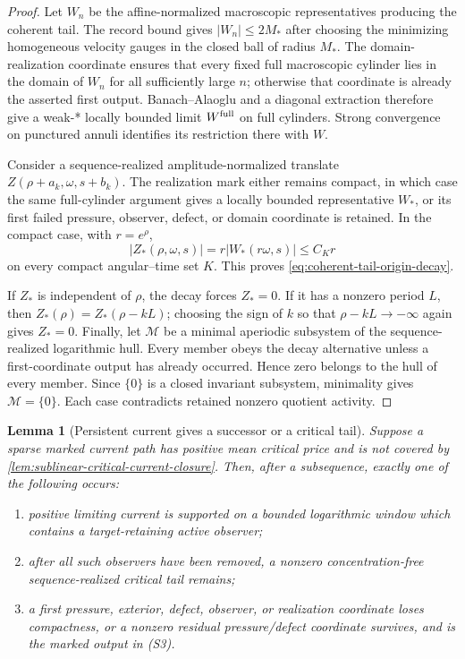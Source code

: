 \documentclass[11pt]{amsart}
\numberwithin{equation}{section}
\theoremstyle{plain}
\newtheorem{lemma}[lemma]{Lemma}
\theoremstyle{definition}
\theoremstyle{remark}
\begin{document}
\begin{proof}
Let \(W_n\) be the affine-normalized macroscopic representatives producing
the coherent tail.  The record bound gives \(|W_n|\le2M_*\) after choosing
the minimizing homogeneous velocity gauges in the closed ball of radius
\(M_*\).  The domain-realization coordinate ensures that every fixed full
macroscopic cylinder lies in the domain of \(W_n\) for all sufficiently large
\(n\); otherwise that coordinate is already the asserted first output.
Banach--Alaoglu and a diagonal extraction therefore give a weak-* locally
bounded limit \(W^{\rm full}\) on full cylinders.  Strong convergence on
punctured annuli identifies its restriction there with \(W\).

Consider a sequence-realized amplitude-normalized translate
\(Z(\rho+a_k,\omega,s+b_k)\).  The realization mark either remains compact,
in which case the same full-cylinder argument gives a locally bounded
representative \(W_*\), or its first failed pressure, observer, defect, or
domain coordinate is retained.  In the compact case, with \(r=e^\rho\),
\[
 |Z_*(\rho,\omega,s)|=r|W_*(r\omega,s)|\le C_Kr
\]
on every compact angular--time set \(K\).  This proves
\eqref{eq:coherent-tail-origin-decay}.

If \(Z_*\) is independent of \(\rho\), the decay forces \(Z_*=0\).  If it has
a nonzero period \(L\), then
\(Z_*(\rho)=Z_*(\rho-kL)\); choosing the sign of \(k\) so that
\(\rho-kL\to-\infty\) again gives \(Z_*=0\).  Finally, let \(\mathcal M\) be
a minimal aperiodic subsystem of the sequence-realized logarithmic hull.
Every member obeys the decay alternative unless a first-coordinate output has
already occurred.  Hence zero belongs to the hull of every member.  Since
\(\{0\}\) is a closed invariant subsystem, minimality gives
\(\mathcal M=\{0\}\).  Each case contradicts retained nonzero quotient
activity.
\end{proof}

\begin{lemma}[Persistent current gives a successor or a critical tail]
\label{lem:persistent-current-support-alternative}
Suppose a sparse marked current path has positive mean critical price and is
not covered by \cref{lem:sublinear-critical-current-closure}.  Then, after a
subsequence, exactly one of the following occurs:
\begin{enumerate}[label=\textup{(C\arabic*)},leftmargin=2.8em]
\item positive limiting current is supported on a bounded logarithmic window
which contains a target-retaining active observer;
\item after all such observers have been removed, a nonzero
concentration-free sequence-realized critical tail remains;
\item a first pressure, exterior, defect, observer, or realization coordinate
loses compactness, or a nonzero residual pressure/defect coordinate survives,
and is the marked output in \textup{(S3)}.
\end{enumerate}
\end{lemma}
\end{document}
